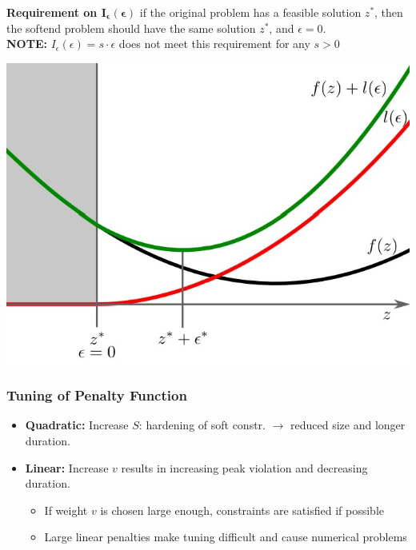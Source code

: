 \begin{minipage}[]{0.49\linewidth}
\textbf{Requirement on $\mathbf{I_\epsilon(\epsilon)}$}
if the original problem has a feasible solution $z^*$, then the softend problem should have the same solution $z^*$, and $\epsilon = 0$.\\
\textbf{NOTE:} $I_\epsilon(\epsilon) = s \cdot \epsilon$ does not meet this requirement for any $s > 0$ \\
\end{minipage}
\begin{minipage}[]{0.49\linewidth}
\includegraphics[width= 0.99\linewidth]{MPC_summary/Images/Quadratic_penalty.jpg}
\end{minipage}
\subsubsection{Tuning of Penalty Function}
\begin{itemize}
    \item \textbf{Quadratic:} Increase $S$: hardening of soft constr. $\rightarrow$ reduced size and longer duration.
    \item \textbf{Linear: }Increase $v$ results in increasing peak violation and decreasing duration.
    \begin{itemize}
        \item If weight $v$ is chosen large enough, constraints are satisfied if possible
        \item Large linear penalties make tuning difficult and cause numerical problems
    \end{itemize}
\end{itemize}
